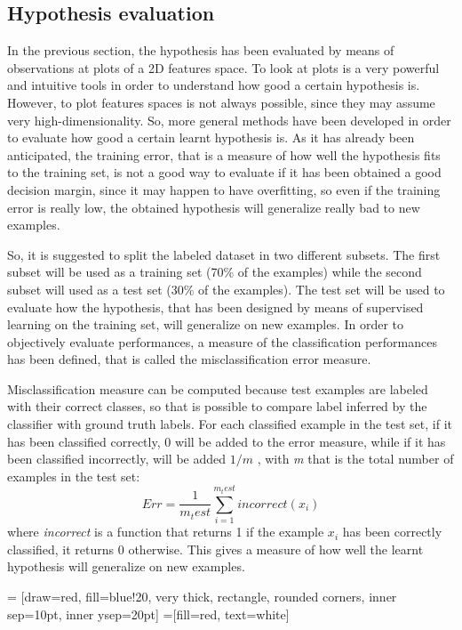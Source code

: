 \documentclass[aps,letterpaper,10pt]{revtex4}
\begin{document}
\subsection{Hypothesis evaluation}
In the previous section, the hypothesis has been evaluated by means of observations at plots of a 2D features space. To look at plots is a very powerful and intuitive tools in order to understand how good a certain hypothesis is. However, to plot features spaces is not always possible, since they may assume very high-dimensionality. So, more general methods have been developed in order to evaluate how good a certain learnt hypothesis is. As it has already been anticipated, the training error, that is a measure of how well the hypothesis fits to the training set, is not a good way to evaluate if it has been obtained a good decision margin, since it may happen to have overfitting, so even if the training error is really low, the obtained hypothesis will generalize really bad to new examples. 

So, it is suggested to split the labeled dataset in two different subsets. The first subset will be used as a training set (70{\%} of the examples) while the second subset will used as a test set (30{\%} of the examples). The test set will be used to evaluate how the hypothesis, that has been designed by means of supervised learning on the training set, will generalize on new examples. In order to objectively evaluate performances, a measure of the classification performances has been defined, that is called the misclassification error measure. 

Misclassification measure can be computed because test examples are labeled with their correct classes, so that is possible to compare label inferred by the classifier with ground truth labels. For each classified example in the test set, if it has been classified correctly, 0 will be added to the error measure, while if it has been classified incorrectly,  will be added $1/m$ , with \textit{m} that is the total number of examples in the test set:
\begin{equation}
Err = \frac{1}{m_test}\sum_{i=1}^{m_test}incorrect( x_{i} )
\end{equation}
where \textit{incorrect} is a function that returns 1 if the example $x_{i}$ has been correctly classified,  it returns 0 otherwise.
This gives a measure of how well the learnt hypothesis will generalize on new examples.


 = [draw=red, fill=blue!20, very thick,
    rectangle, rounded corners, inner sep=10pt, inner ysep=20pt]
 =[fill=red, text=white]
\end{document}
